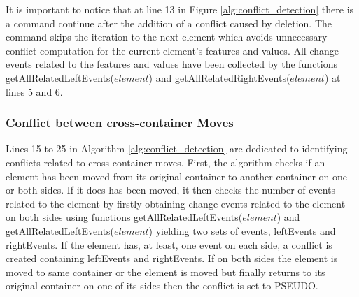 It is important to notice that at line 13 in Figure \ref{alg:conflict_detection} there is a command \textsf{continue} after the addition of a conflict caused by deletion. The command skips the iteration to the next element which avoids unnecessary conflict computation for the current element's  features and values. All change events related to the features and values have been collected by the functions \textsf{getAllRelatedLeftEvents($element$)} and \textsf{getAllRelatedRightEvents($element$)} at lines 5 and 6.  

\subsubsection{Conflict between cross-container Moves} 
\label{sec:move_conflict} 
Lines 15 to 25 in Algorithm \ref{alg:conflict_detection} are dedicated to identifying conflicts related to cross-container moves. 
First, the algorithm checks if an element has been moved from its original container to another container on one or both sides. 
If it does has been moved, 
it then checks the number of events related to the element by firstly obtaining change events related to the element on 
both sides using functions \textsf{getAllRelatedLeftEvents($element$)} and \textsf{getAllRelatedLeftEvents($element$)} yielding two sets of events, 
\textsf{leftEvents} and \textsf{rightEvents}. If the element has, at least, one event on each side,
a conflict is created containing \textsf{leftEvents} and \textsf{rightEvents}. 
If on both sides the element is moved to same container or the element is moved but finally returns to its original container on one of its sides then the conflict is set to \textsf{PSEUDO}.

  

